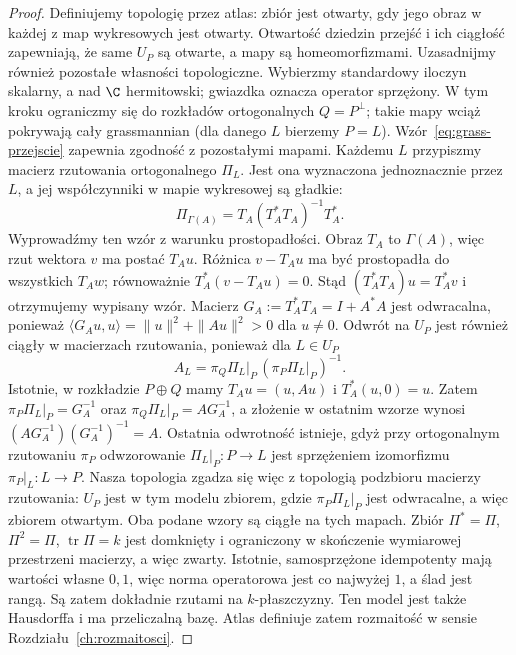 \begin{proof}
Definiujemy topologię przez atlas: zbiór jest otwarty, gdy
jego obraz w każdej z map wykresowych jest otwarty.
Otwartość dziedzin przejść i ich ciągłość zapewniają, że
same $U_P$ są otwarte, a mapy są homeomorfizmami.
Uzasadnijmy również pozostałe własności topologiczne.
Wybierzmy standardowy iloczyn skalarny, a nad $\C$ hermitowski;
gwiazdka oznacza operator sprzężony. W tym kroku
ograniczmy się do rozkładów ortogonalnych $Q=P^\perp$;
takie mapy wciąż pokrywają cały grassmannian
(dla danego $L$ bierzemy $P=L$).
Wzór~\eqref{eq:grass-przejscie} zapewnia zgodność
z pozostałymi mapami. Każdemu $L$
przypiszmy macierz rzutowania ortogonalnego $\Pi_L$.
Jest ona wyznaczona jednoznacznie przez $L$, a jej
współczynniki w mapie wykresowej są gładkie:
\[
 \Pi_{\Gamma(A)}
  =T_A(T_A^*T_A)^{-1}T_A^*.
\]
Wyprowadźmy ten wzór z warunku prostopadłości.
Obraz $T_A$ to $\Gamma(A)$, więc rzut wektora $v$ ma postać
$T_Au$. Różnica $v-T_Au$ ma być prostopadła do wszystkich
$T_Aw$; równoważnie $T_A^*(v-T_Au)=0$.
Stąd $(T_A^*T_A)u=T_A^*v$ i otrzymujemy wypisany wzór.
Macierz $G_A:=T_A^*T_A=I+A^*A$ jest odwracalna, ponieważ
$\langle G_Au,u\rangle=\|u\|^2+\|Au\|^2>0$ dla $u\ne0$.
Odwrót na $U_P$ jest również ciągły w macierzach
rzutowania, ponieważ dla $L\in U_P$
\[
 A_L=\pi_Q\Pi_L|_P\,(\pi_P\Pi_L|_P)^{-1}.
\]
Istotnie, w rozkładzie $P\oplus Q$ mamy
$T_Au=(u,Au)$ i $T_A^*(u,0)=u$.
Zatem $\pi_P\Pi_L|_P=G_A^{-1}$ oraz
$\pi_Q\Pi_L|_P=AG_A^{-1}$, a złożenie w ostatnim wzorze
wynosi $(AG_A^{-1})(G_A^{-1})^{-1}=A$.
Ostatnia odwrotność istnieje, gdyż przy ortogonalnym
rzutowaniu $\pi_P$ odwzorowanie $\Pi_L|_P:P\to L$
jest sprzężeniem izomorfizmu
$\pi_P|_L:L\to P$. Nasza topologia zgadza się więc
z topologią podzbioru macierzy rzutowania: $U_P$ jest w tym
modelu zbiorem, gdzie $\pi_P\Pi_L|_P$ jest odwracalne,
a więc zbiorem otwartym. Oba podane wzory są ciągłe na tych mapach.
Zbiór $\Pi^*=\Pi$, $\Pi^2=\Pi$, $\operatorname{tr}\Pi=k$
jest domknięty i ograniczony w skończenie wymiarowej
przestrzeni macierzy, a więc zwarty. Istotnie, samosprzężone
idempotenty mają wartości własne $0,1$, więc norma operatorowa
jest co najwyżej $1$, a ślad jest rangą. Są zatem dokładnie
rzutami na $k$-płaszczyzny. Ten model jest także
Hausdorffa i ma przeliczalną bazę. Atlas definiuje
zatem rozmaitość w sensie Rozdziału~\ref{ch:rozmaitosci}.
\end{proof}

